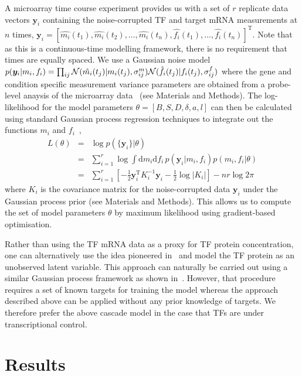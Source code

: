 \documentclass{pnastwo}
\begin{document}
\begin{article}
A microarray time course experiment provides us with a set of $r$
replicate data vectors $\bm y_i$ containing the noise-corrupted TF and target mRNA
measurements at $n$ times,
$\bm y_i=[\hat{m_i}(t_1),\hat{m_i}(t_2),\ldots,\hat{m_i}(t_n),\hat{f_i}(t_1),\ldots,\hat{f_i}(t_n)]^\mathrm{T}$. Note
that as this is a continuous-time modelling framework, there is no
requirement that times are equally spaced. We use a Gaussian noise model
$p(\bm y_i|m_i,f_i)=\prod_{ij}{\cal
  N}(\hat{m_i}(t_j)|m_i(t_j),\sigma^m_{ij}){\cal
  N}(\hat{f_i}(t_j)|f_i(t_j),\sigma^f_{ij})$ where the gene and condition
specific measurement variance parameters are obtained from a probe-level anaysis of the microarray data~\cite{Liu2005,Pearson2009} (see
Materials and Methods). The log-likelihood for the model parameters
$\theta=[B,S,D,\delta,a,l]$ can then be calculated using standard Gaussian process regression
techniques to integrate out the functions $m_i$ and $f_i$~\cite{Rasmussen2006},
\begin{eqnarray*}
L(\theta) & = & \log p(\{\bm y_i\}|\theta) \\
& = & \sum_{i=1}^r \log \!\int \!\mathrm{d}m_i\mathrm{d}f_i\,
p(\bm y_i|m_i,f_i)p(m_i,f_i|\theta)  \\
& = & \sum_{i=1}^r \left[-\frac{1}{2}\bm y_i^\mathrm{T} K_i^{-1} \bm y_i -
\frac{1}{2}\log|K_i|\right] -nr\log 2\pi
\end{eqnarray*}
where $K_i$ is the covariance matrix for the
noise-corrupted data $\bm y_i$ under the Gaussian process prior (see
Materials and Methods). This allows us to compute the set of model
parameters $\theta$ by maximum
likelihood using gradient-based optimisation. 

Rather than using the TF mRNA data as a proxy for TF protein concentration,
one can alternatively use the idea pioneered
in~\cite{Barenco2006a} and model the TF protein as an unobserved
latent variable. This approach can naturally be carried out using a
similar Gaussian process framework as shown in~\cite{Gao2008}. However, that procedure requires a set of known
targets for training the model whereas the approach described above
can be applied without any prior knowledge of targets. We therefore
prefer the above cascade model in the case that TFs are under
transcriptional control. 

\section{Results}


\end{article}
\end{document}
